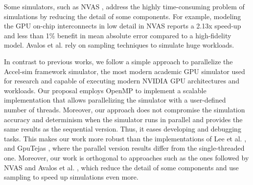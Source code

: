 \par
Some simulators, such as NVAS \cite{nvas}, address the highly time-consuming problem of simulations by reducing the detail of some components. For example, modeling the GPU on-chip interconnects in low detail in NVAS reports a 2.13x speed-up and less than 1\% benefit in mean absolute error compared to a high-fidelity model. Avalos et al. \cite{pcaKernelGpuSampling} rely on sampling techniques to simulate huge workloads.

\par
In contrast to previous works, we follow a simple approach to parallelize the Accel-sim framework simulator, the most modern academic GPU simulator used for research and capable of executing modern NVIDIA GPU architectures and workloads. Our proposal employs OpenMP \cite{openmp} to implement a scalable implementation that allows parallelizing the simulator with a user-defined number of threads. Moreover, our approach does not compromise the simulation accuracy and determinism when the simulator runs in parallel and provides the same results as the sequential version. Thus, it eases developing and debugging tasks. This makes our work more robust than the implementations of Lee et al. \cite{parallelGPUSim1} \cite{parallelGPUSim2}, and GpuTejas \cite{gputejas}, where the parallel version results differ from the single-threaded one. Moreover, our work is orthogonal to approaches such as the ones followed by NVAS \cite{nvas} and Avalos et al. \cite{pcaKernelGpuSampling}, which reduce the detail of some components and use sampling to speed up simulations even more.